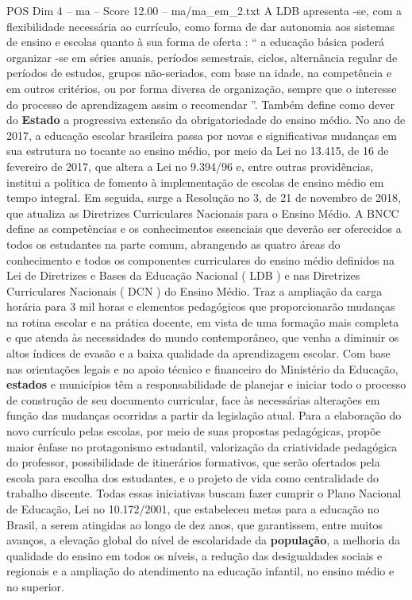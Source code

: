 \begin{textsample}{POS Dim 4 – ma – Score 12.00 – ma/ma\_em\_2.txt}
A LDB apresenta -se, com a flexibilidade necessária ao currículo, como forma de dar autonomia aos sistemas de ensino e escolas quanto à sua forma de oferta : “ a educação básica poderá organizar -se em séries anuais, períodos semestrais, ciclos, alternância regular de períodos de estudos, grupos não-seriados, com base na idade, na competência e em outros critérios, ou por forma diversa de organização, sempre que o interesse do processo de aprendizagem assim o recomendar ”.
Também define como dever do \textbf{Estado} a progressiva extensão da obrigatoriedade do ensino médio.
No ano de 2017, a educação escolar brasileira passa por novas e significativas mudanças em sua estrutura no tocante ao ensino médio, por meio da Lei no 13.415, de 16 de fevereiro de 2017, que altera a Lei no 9.394/96 e, entre outras providências, institui a política de fomento à implementação de escolas de ensino médio em tempo integral.
Em seguida, surge a Resolução no 3, de 21 de novembro de 2018, que atualiza as Diretrizes Curriculares Nacionais para o Ensino Médio.
A BNCC define as competências e os conhecimentos essenciais que deverão ser oferecidos a todos os estudantes na parte comum, abrangendo as quatro áreas do conhecimento e todos os componentes curriculares do ensino médio definidos na Lei de Diretrizes e Bases da Educação Nacional ( LDB ) e nas Diretrizes Curriculares Nacionais ( DCN ) do Ensino Médio.
Traz a ampliação da carga horária para 3 mil horas e elementos pedagógicos que proporcionarão mudanças na rotina escolar e na prática docente, em vista de uma formação mais completa e que atenda às necessidades do mundo contemporâneo, que venha a diminuir os altos índices de evasão e a baixa qualidade da aprendizagem escolar.
Com base nas orientações legais e no apoio técnico e financeiro do Ministério da Educação, \textbf{estados} e municípios têm a responsabilidade de planejar e iniciar todo o processo de construção de seu documento curricular, face às necessárias alterações em função das mudanças ocorridas a partir da legislação atual.
Para a elaboração do novo currículo pelas escolas, por meio de suas propostas pedagógicas, propõe maior ênfase no protagonismo estudantil, valorização da criatividade pedagógica do professor, possibilidade de itinerários formativos, que serão ofertados pela escola para escolha dos estudantes, e o projeto de vida como centralidade do trabalho discente.
Todas essas iniciativas buscam fazer cumprir o Plano Nacional de Educação, Lei no 10.172/2001, que estabeleceu metas para a educação no Brasil, a serem atingidas ao longo de dez anos, que garantissem, entre muitos avanços, a elevação global do nível de escolaridade da \textbf{população}, a melhoria da qualidade do ensino em todos os níveis, a redução das desigualdades sociais e regionais e a ampliação do atendimento na educação infantil, no ensino médio e no superior.

\end{textsample}
